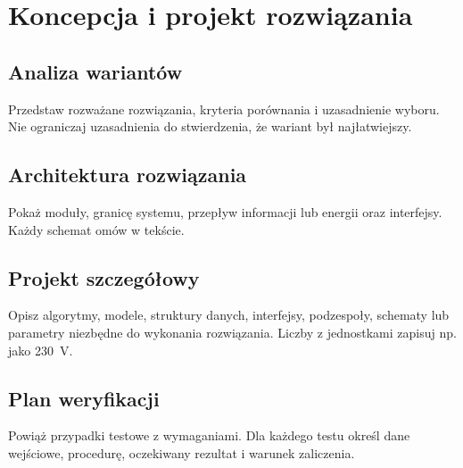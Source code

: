 \chapter{Koncepcja i projekt rozwiązania}
\label{chap:projekt}

\section{Analiza wariantów}
Przedstaw rozważane rozwiązania, kryteria porównania i uzasadnienie wyboru. Nie ograniczaj uzasadnienia do stwierdzenia, że wariant był najłatwiejszy.

\section{Architektura rozwiązania}
Pokaż moduły, granicę systemu, przepływ informacji lub energii oraz interfejsy. Każdy schemat omów w tekście.

\section{Projekt szczegółowy}
Opisz algorytmy, modele, struktury danych, interfejsy, podzespoły, schematy lub parametry niezbędne do wykonania rozwiązania. Liczby z jednostkami zapisuj np. jako \qty{230}{\volt}.

\section{Plan weryfikacji}
Powiąż przypadki testowe z wymaganiami. Dla każdego testu określ dane wejściowe, procedurę, oczekiwany rezultat i warunek zaliczenia.
